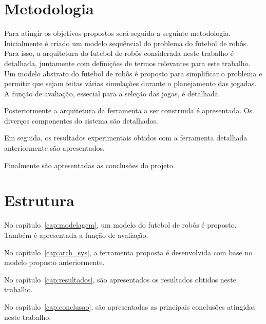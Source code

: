 \section{Metodologia}

Para atingir os objetivos propostos será seguida a seguinte metodologia.
Inicialmente é criado um modelo sequêncial do problema do futebol de robôs. 
Para isso, a arquitetura do futebol de robôs considerada neste trabalho é
detalhada, juntamente com definições de termos relevantes para este trabalho.
Um modelo abstrato do futebol de robôs é proposto para simplificar o problema
e permitir que sejam feitas várias simulações durante o planejamento das
jogadas. A função de avaliação, essecial para a seleção das jogas, é detalhada.

Posteriormente a arquitetura da ferramenta a ser construida é apresentada.
Os diverços componentes do sistema são detalhados.

Em seguida, os resultados experimentais obtidos com a ferramenta detalhada
anteriormente são apresentados.

Finalmente são apresentadas as conclusões do projeto.

\section{Estrutura}

No capítulo~\ref{cap:modelagem}, um modelo do futebol de robôs é proposto.
Também é apresentada a função de avaliação.

No capítulo~\ref{cap:arch_sys}, a ferramenta proposta é desenvolvida com
base no modelo proposto anteriormente.

No capítulo~\ref{cap:resultados}, são apresentados os resultados obtidos
neste trabalho.

No capítulo~\ref{cap:conclusao}, são apresentadas as principais conclusões
atingidas neste trabalho.

